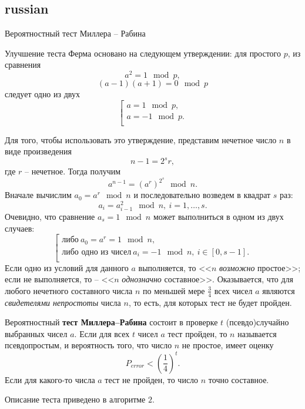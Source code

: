 \subsection{russian}{Вероятностный тест Миллера -- Рабина}

Улучшение теста Ферма основано на следующем утверждении: для простого $p$, из сравнения
    \[ a^2 = 1 \mod p, \]
    \[ (a-1)(a+1) = 0 \mod p \]
следует одно из двух
\[ \left[ \begin{array}{l}
     a = 1 \mod p, \\
     a = -1 \mod p. \\
\end{array} \right. \]

Для того, чтобы использовать это утверждение, представим нечетное число $n$  в виде произведения
    \[ n-1 = 2^s r, \]
где $r$ -- нечетное. Тогда получим
    \[ a^{n-1} = (a^r)^{2^s} \mod n. \]
Вначале вычислим $a_0 = a^r \mod n$ и последовательно возведем в квадрат $s$ раз:
    \[ a_i = a_{i-1}^2 \mod n, ~ i = 1, \dots, s. \]
Очевидно, что сравнение $a_s = 1 \mod n$ может выполниться в одном из двух случаев:
\[ \left[ \begin{array}{l}
    \text{либо}~ a_0 = a^r = 1 \mod n, \\
    \text{либо одно из чисел}~ a_i = -1 \mod n, ~ i \in [0, s-1]. \\
\end{array} \right. \]
Если одно из условий для данного $a$  выполняется, то  <<$n$ \emph{возможно} простое>>; если не выполняется, то -- <<$n$ \emph{однозначно} составное>>. Оказывается, что для любого нечетного составного числа $n$ по меньшей мере $\frac{3}{4}$ всех чисел $a$ являются \emph{свидетелями непростоты} числа $n$, то есть, для которых тест не будет пройден.

Вероятностный \textbf{тест Миллера--Рабина} состоит в проверке $t$ (псевдо)случайно выбранных чисел $a$. Если для всех $t$ чисел $a$ тест пройден, то $n$ называется псевдопростым, и вероятность того, что число $n$ не простое, имеет оценку
    \[ P_{error} < \left( \frac{1}{4} \right)^t. \]
Если для какого-то числа $a$ тест не пройден, то число $n$ точно составное.

Описание теста приведено в алгоритме $2$.

